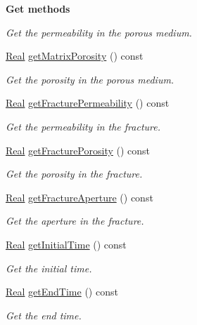 \begin{Indent}{\bf Get methods}
\begin{DoxyCompactItemize}
\begin{DoxyCompactList}\small\item\em Get the permeability in the porous medium. \end{DoxyCompactList}\item 
\hyperlink{namespaceFVCode3D_a40c1f5588a248569d80aa5f867080e83}{Real} \hyperlink{classFVCode3D_1_1Data_abd5d55762c5909d5e8acd5632ea2a4a1}{get\+Matrix\+Porosity} () const 
\begin{DoxyCompactList}\small\item\em Get the porosity in the porous medium. \end{DoxyCompactList}\item 
\hyperlink{namespaceFVCode3D_a40c1f5588a248569d80aa5f867080e83}{Real} \hyperlink{classFVCode3D_1_1Data_a4bc74949417d0582540b5644bc237bdc}{get\+Fracture\+Permeability} () const 
\begin{DoxyCompactList}\small\item\em Get the permeability in the fracture. \end{DoxyCompactList}\item 
\hyperlink{namespaceFVCode3D_a40c1f5588a248569d80aa5f867080e83}{Real} \hyperlink{classFVCode3D_1_1Data_a0993d43ae0cd2a16e9adf69fb2368645}{get\+Fracture\+Porosity} () const 
\begin{DoxyCompactList}\small\item\em Get the porosity in the fracture. \end{DoxyCompactList}\item 
\hyperlink{namespaceFVCode3D_a40c1f5588a248569d80aa5f867080e83}{Real} \hyperlink{classFVCode3D_1_1Data_af7b6391c187f2c9ad1fef56c74dac5ed}{get\+Fracture\+Aperture} () const 
\begin{DoxyCompactList}\small\item\em Get the aperture in the fracture. \end{DoxyCompactList}\item 
\hyperlink{namespaceFVCode3D_a40c1f5588a248569d80aa5f867080e83}{Real} \hyperlink{classFVCode3D_1_1Data_a4e424bc75d28ee591be0c0a930b6f871}{get\+Initial\+Time} () const 
\begin{DoxyCompactList}\small\item\em Get the initial time. \end{DoxyCompactList}\item 
\hyperlink{namespaceFVCode3D_a40c1f5588a248569d80aa5f867080e83}{Real} \hyperlink{classFVCode3D_1_1Data_a2685bdd2501d7545fc8660bd9525d8fa}{get\+End\+Time} () const 
\begin{DoxyCompactList}\small\item\em Get the end time. \end{DoxyCompactList}\item 

\end{DoxyCompactItemize}
\end{Indent}
